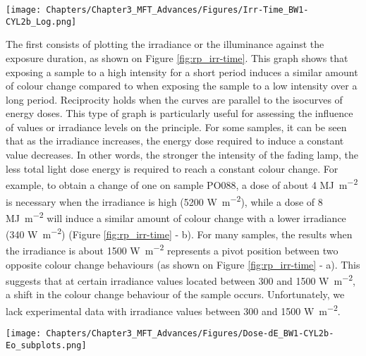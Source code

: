 \begin{figure*}[!h]
\centering
\texttt{[image: Chapters/Chapter3\_MFT\_Advances/Figures/Irr-Time\_BW1-CYL2b\_Log.png]}
\caption[\hspace{0.3cm}Irradiance-Time plots]{Irradiance-Time plots: (a) BW1 and (b) CYL2b\footnote{Log scales have been used in Figure \ref{fig:rp_irr-time} to enhance visibility of the results.}.}
\label{fig:rp_irr-time}
\end{figure*}

The first consists of plotting the irradiance or the illuminance against the exposure duration, as shown on Figure \ref{fig:rp_irr-time}. This graph shows that exposing a sample to a high intensity for a short period induces a similar amount of colour change compared to when exposing the sample to a low intensity over a long period. Reciprocity holds when the \dE curves are parallel to the isocurves of energy doses. This type of graph is particularly useful for assessing the influence of \dE values or irradiance levels on the principle. For some samples, it can be seen that as the irradiance increases, the energy dose required to induce a constant \dE value decreases. In other words, the stronger the intensity of the fading lamp, the less total light dose energy is required to reach a constant colour change. For example, to obtain a change of one \dEOO on sample PO088, a dose of about 4 \unit{\mega\joule\per\square\metre} is necessary when the irradiance is high (5200 \unit{\watt\per\square\metre}), while a dose of 8 \unit{\mega\joule\per\square\metre} will induce a similar amount of colour change with a lower irradiance (340 \unit{\watt\per\square\metre}) (Figure \ref{fig:rp_irr-time} - b). For many samples, the results when the irradiance is about 1500 \unit{\watt\per\square\metre} represents a pivot position between two opposite colour change behaviours (as shown on Figure \ref{fig:rp_irr-time} - a). This suggests that at certain irradiance values located between 300 and 1500 \unit{\watt\per\square\metre}, a shift in the colour change behaviour of the sample occurs. Unfortunately, we lack experimental data with irradiance values between 300 and 1500 \unit{\watt\per\square\metre}.\\

\begin{figure*}[!h]
\centering
\texttt{[image: Chapters/Chapter3\_MFT\_Advances/Figures/Dose-dE\_BW1-CYL2b-Eo\_subplots.png]}
\caption[\hspace{0.3cm}Dose - \dEOO curves]{Microfading results representing \dEOO curves (a, b, c) and CIE $L^*$ curve (d).}
\label{fig:rp_dose-dE00}
\end{figure*}


